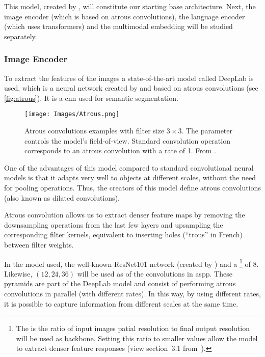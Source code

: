 This model, created by , will constitute our starting
base architecture. Next, the image encoder (which is based on atrous
convolutions), the language encoder (which uses transformers) and the
multimodal embedding will be studied separately.

\subsubsection{Image Encoder}

To extract the features of the images a state-of-the-art model called DeepLab
is used, which is a neural network created by  and based
on atrous convolutions (see \vref{fig:atrous}). It is a \gls{cnn} used for
semantic segmentation.

\begin{figure}[ht]
  \centering
  \texttt{[image: Images/Atrous.png]}
  \caption[Atrous convolutions examples]{Atrous convolutions examples with
    filter size \(3 \times 3\). The  parameter controls the model's
    field-of-view. Standard convolution operation corresponds to an atrous
    convolution with a rate of 1. From
    .}\label{fig:atrous}
\end{figure}

One of the advantages of this model compared to standard convolutional neural
models is that it adapts very well to objects at different scales, without the
need for pooling operations. Thus, the creators of this model define atrous
convolutions (also known as dilated convolutions).

\begin{quoteBox}
  Atrous convolution allows us to extract denser feature maps by removing the
  downsampling operations from the last few layers and upsampling the
  corresponding filter kernels, equivalent to inserting holes (``trous'' in
  French) between filter weights.
  \tcblower{}
\end{quoteBox}

In the model used, the well-known ResNet101 network (created by
) and a \footnote{The
   is the ratio of input images patial resolution to final
  output resolution will be used as backbone. Setting this ratio to smaller
  values allow the model to extract denser feature responses (view section~3.1
  from~\cite{chen17:rethin}).} of 8. Likewise, \((12, 24, 36)\) will be used as
 of the convolutions in \gls{aspp}. These pyramids are part of the
DeepLab model and consist of performing atrous convolutions in parallel (with
different rates). In this way, by using different rates, it is possible to
capture information from different scales at the same time.

